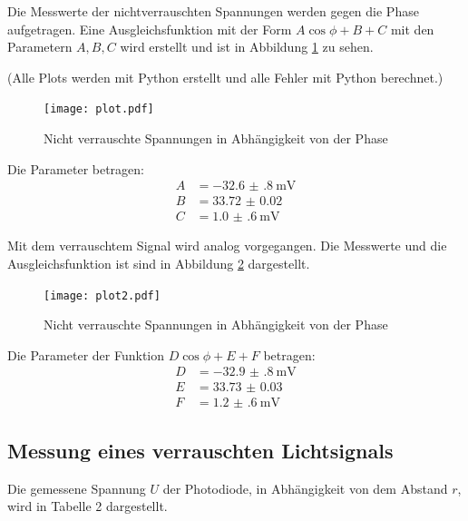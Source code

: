 Die Messwerte der nichtverrauschten Spannungen werden gegen die Phase aufgetragen. Eine Ausgleichsfunktion mit der Form
$A \cos{\phi + B} + C$ mit den Parametern $A, B ,C$ wird erstellt und ist in Abbildung \ref{fig:plot} zu sehen.

(Alle Plots werden mit Python erstellt und alle Fehler mit Python berechnet.)



\begin{figure}[H]
  \centering
  \texttt{[image: plot.pdf]}
  \caption{Nicht verrauschte Spannungen in Abhängigkeit von der Phase}
  \label{fig:plot}
\end{figure}

Die Parameter betragen:
\begin{align*}
  A &= \SI{-32.6(8)}{\milli\volt} \\
  B &= \SI{33.72(2)}{} \\
  C &= \SI{1.0(6)}{\milli\volt}
\end{align*}


Mit dem verrauschtem Signal wird analog vorgegangen. Die Messwerte und die Ausgleichsfunktion ist sind in Abbildung \ref{fig:plot2} dargestellt.

\begin{figure}[H]
  \centering
  \texttt{[image: plot2.pdf]}
  \caption{Nicht verrauschte Spannungen in Abhängigkeit von der Phase}
  \label{fig:plot2}
\end{figure}


Die Parameter der Funktion $D \cos{\phi + E} + F$ betragen:
\begin{align*}
  D &= \SI{-32.9(8)}{\milli\volt} \\
  E &= \SI{33.73(3)}{} \\
  F &= \SI{1.2(6)}{\milli\volt}
\end{align*}



\subsection{Messung eines verrauschten Lichtsignals}
Die gemessene Spannung $U$ der Photodiode, in Abhängigkeit von dem Abstand $r$, wird in Tabelle 2 dargestellt.

